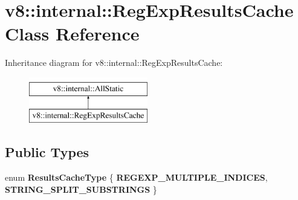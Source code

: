 \hypertarget{classv8_1_1internal_1_1RegExpResultsCache}{}\section{v8\+:\+:internal\+:\+:Reg\+Exp\+Results\+Cache Class Reference}
\label{classv8_1_1internal_1_1RegExpResultsCache}
Inheritance diagram for v8\+:\+:internal\+:\+:Reg\+Exp\+Results\+Cache\+:\begin{figure}[H]
\begin{center}
\leavevmode
\includegraphics[height=2.000000cm]{classv8_1_1internal_1_1RegExpResultsCache}
\end{center}
\end{figure}
\subsection*{Public Types}
\begin{DoxyCompactItemize}
\item 
\mbox{\label{classv8_1_1internal_1_1RegExpResultsCache_a3899f4b7c08be12c8deb57d5fa9dcd01}} 
enum {\bfseries Results\+Cache\+Type} \{ {\bfseries R\+E\+G\+E\+X\+P\+\_\+\+M\+U\+L\+T\+I\+P\+L\+E\+\_\+\+I\+N\+D\+I\+C\+ES}, 
{\bfseries S\+T\+R\+I\+N\+G\+\_\+\+S\+P\+L\+I\+T\+\_\+\+S\+U\+B\+S\+T\+R\+I\+N\+GS}
 \}
\end{DoxyCompactItemize}
